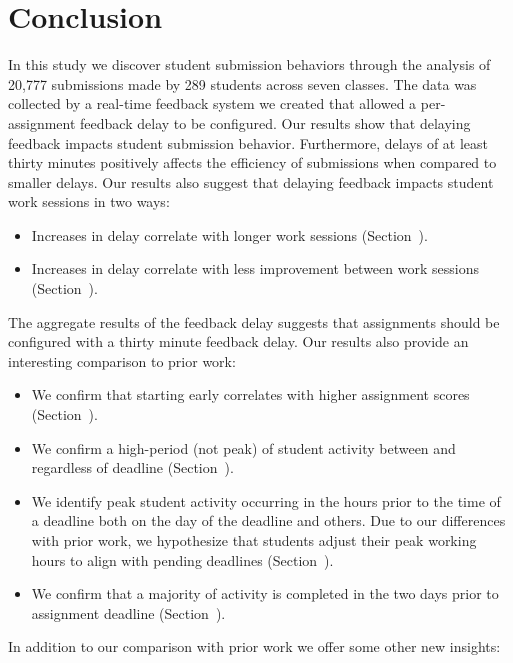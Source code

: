 \section{Conclusion} 
In this study we discover student submission behaviors through the analysis of
20,777 submissions made by 289 students across seven classes. The data was
collected by a real-time feedback system we created that allowed a
per-assignment feedback delay to be configured. Our results show that delaying
feedback impacts student submission behavior. Furthermore, delays of at least
thirty minutes positively affects the efficiency of submissions when compared
to smaller delays. Our results also suggest that delaying feedback impacts
student work sessions in two ways:

\begin{itemize}
\item Increases in delay correlate with longer work sessions
  (Section~).
\item Increases in delay correlate with less improvement between work sessions
  (Section~).
\end{itemize}

The aggregate results of the feedback delay suggests that assignments should be
configured with a thirty minute feedback delay. Our results also provide an
interesting comparison to prior work:

\begin{itemize}
\item We confirm that starting early correlates with higher assignment
  scores (Section~).
\item We confirm a high-period (not peak) of student activity between 
  and  regardless of deadline (Section~).
\item We identify peak student activity occurring in the hours prior to the
  time of a deadline both on the day of the deadline and others. Due to our
  differences with prior work, we hypothesize that students adjust their peak
  working hours to align with pending deadlines (Section~).
\item We confirm that a majority of activity is completed in the two days prior
  to assignment deadline (Section~).
\end{itemize}

In addition to our comparison with prior work we offer some other new insights:

